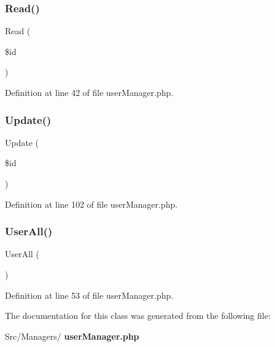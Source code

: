 \mbox{\label{class_src_1_1_managers_1_1user_manager_ad2bbc9b3130abdfe3a9fc9e9fe36716f}} 
\subsubsection{Read()}
{\footnotesize\ttfamily Read (\begin{DoxyParamCaption}\item[{}]{\$id }\end{DoxyParamCaption})}



Definition at line 42 of file user\+Manager.\+php.

\mbox{\label{class_src_1_1_managers_1_1user_manager_a82232b33fbfacdbdb8a8f49acaecf564}} 
\subsubsection{Update()}
{\footnotesize\ttfamily Update (\begin{DoxyParamCaption}\item[{}]{\$id }\end{DoxyParamCaption})}



Definition at line 102 of file user\+Manager.\+php.

\mbox{\label{class_src_1_1_managers_1_1user_manager_a0a377befd1052a5f989fd915af31373b}} 
\subsubsection{User\+All()}
{\footnotesize\ttfamily User\+All (\begin{DoxyParamCaption}{ }\end{DoxyParamCaption})}



Definition at line 53 of file user\+Manager.\+php.



The documentation for this class was generated from the following file\+:\begin{DoxyCompactItemize}
\item 
Src/\+Managers/\textbf{ user\+Manager.\+php}\end{DoxyCompactItemize}
